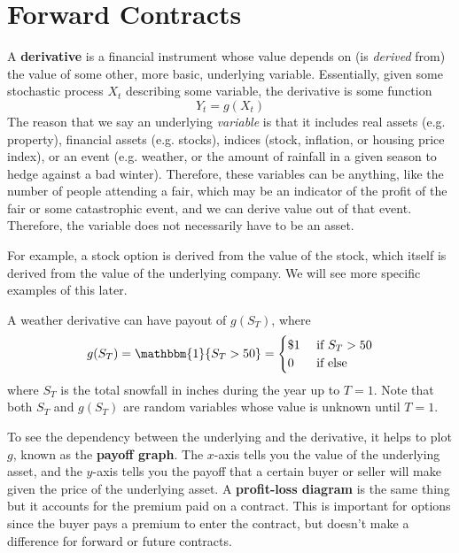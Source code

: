 \documentclass{article}
\begin{document}
\section{Forward Contracts} 

    \begin{definition}[Derivatives]
      A \textbf{derivative} is a financial instrument whose value depends on (is \textit{derived} from) the value of some other, more basic, underlying variable. Essentially, given some stochastic process $X_t$ describing some variable, the derivative is some function 
      \begin{equation}
        Y_t = g(X_t)
      \end{equation}
      The reason that we say an underlying \textit{variable} is that it includes real assets (e.g. property), financial assets (e.g. stocks), indices (stock, inflation, or housing price index), or an event (e.g. weather, or the amount of rainfall in a given season to hedge against a bad winter). Therefore, these variables can be anything, like the number of people attending a fair, which may be an indicator of the profit of the fair or some catastrophic event, and we can derive value out of that event. Therefore, the variable does not necessarily have to be an asset. 
    \end{definition}

    \begin{example}
      For example, a stock option is derived from the value of the stock, which itself is derived from the value of the underlying company. We will see more specific examples of this later. 
    \end{example}

    \begin{example}
      A weather derivative can have payout of $g(S_T)$, where 
      \begin{equation}
        g(S_T) = \mathbbm{1} \{S_T > 50\} = \begin{cases} \$1 & \text{ if } S_T > 50 \\ 0 & \text{ if else} \end{cases}
      \end{equation}
      where $S_T$ is the total snowfall in inches during the year up to $T = 1$. Note that both $S_T$ and $g(S_T)$ are random variables whose value is unknown until $T = 1$.
    \end{example}

    \begin{definition}
      To see the dependency between the underlying and the derivative, it helps to plot $g$, known as the \textbf{payoff graph}. The $x$-axis tells you the value of the underlying asset, and the $y$-axis tells you the payoff that a certain buyer or seller will make given the price of the underlying asset. 
      A \textbf{profit-loss diagram} is the same thing but it accounts for the premium paid on a contract. This is important for options since the buyer pays a premium to enter the contract, but doesn't make a difference for forward or future contracts. 
    \end{definition}
\end{document}
